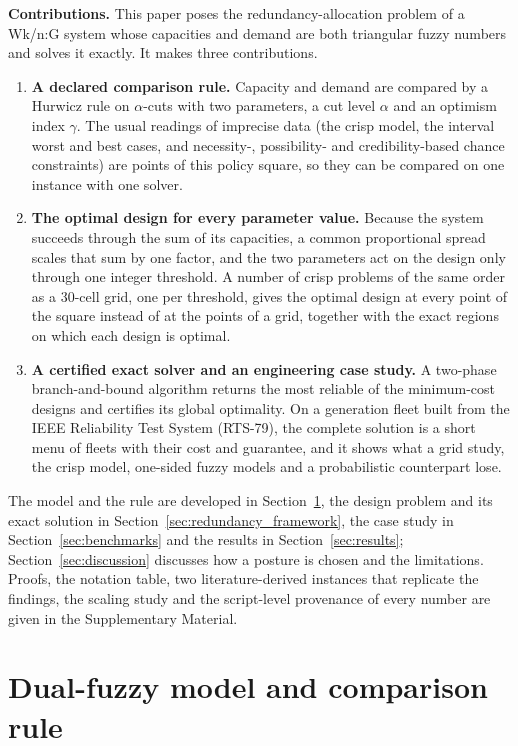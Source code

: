 \documentclass[Review,sagev,times]{sagej}%
\begin{document}
\textbf{Contributions.} This paper poses the redundancy-allocation problem of a Wk/n:G system whose capacities
and demand are both triangular fuzzy numbers and solves it exactly. It makes three contributions.
\begin{enumerate}
  \item \textbf{A declared comparison rule.} Capacity and demand are compared by a Hurwicz rule on $\alpha$-cuts
  with two parameters, a cut level $\alpha$ and an optimism index $\gamma$. The usual readings of imprecise data
  (the crisp model, the interval worst and best cases, and necessity-, possibility- and credibility-based chance
  constraints) are points of this policy square, so they can be compared on one instance with one solver.
  \item \textbf{The optimal design for every parameter value.} Because the system succeeds through the sum of
  its capacities, a common proportional spread scales that sum by one factor, and the two parameters act on the
  design only through one integer threshold. A number of crisp problems of the same order as a $30$-cell grid, one per threshold, gives the
  optimal design at every point of the square instead of at the points of a grid, together with the exact
  regions on which each design is optimal.
  \item \textbf{A certified exact solver and an engineering case study.} A two-phase branch-and-bound algorithm
  returns the most reliable of the minimum-cost designs and certifies its global optimality. On a generation
  fleet built from the IEEE Reliability Test System (RTS-79)\cite{IEEERTS1979}, the complete solution is a
  short menu of fleets with their cost and guarantee, and it shows what a grid study, the crisp model, one-sided
  fuzzy models and a probabilistic counterpart lose.
\end{enumerate}
The model and the rule are developed in Section~\ref{sec:theory}, the design problem and its exact solution in
Section~\ref{sec:redundancy_framework}, the case study in Section~\ref{sec:benchmarks} and the results in
Section~\ref{sec:results}; Section~\ref{sec:discussion} discusses how a posture is chosen and the limitations.
Proofs, the notation table, two literature-derived instances that replicate the findings, the scaling study and
the script-level provenance of every number are given in the Supplementary Material.

\section{Dual-fuzzy model and comparison rule} \label{sec:theory}
\end{document}
